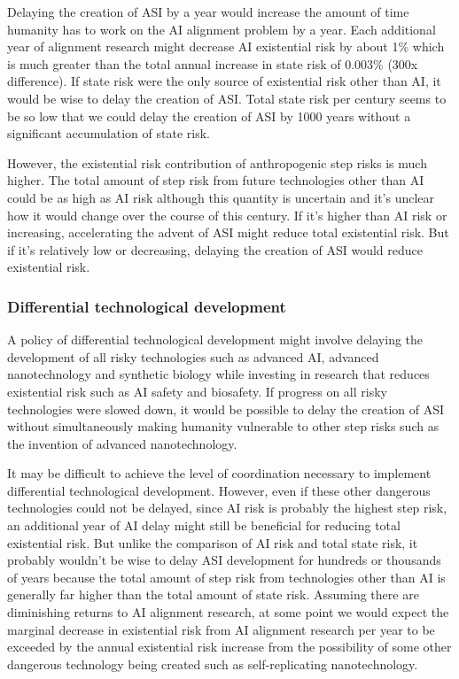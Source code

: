 \documentclass{article}
\begin{document}
Delaying the creation of ASI by a year would increase the amount of time humanity has to work on the AI alignment problem by a year. Each additional year of alignment research might decrease AI existential risk by about 1\% which is much greater than the total annual increase in state risk of 0.003\% (300x difference). If state risk were the only source of existential risk other than AI, it would be wise to delay the creation of ASI. Total state risk per century seems to be so low that we could delay the creation of ASI by 1000 years without a significant accumulation of state risk.

However, the existential risk contribution of anthropogenic step risks is much higher. The total amount of step risk from future technologies other than AI could be as high as AI risk \cite{theprecipice, globalcatastrophicriskssurvey} although this quantity is uncertain and it's unclear how it would change over the course of this century. If it’s higher than AI risk or increasing, accelerating the advent of ASI might reduce total existential risk. But if it's relatively low or decreasing, delaying the creation of ASI would reduce existential risk.

\subsubsection{Differential technological development}

A policy of differential technological development might involve delaying the development of all risky technologies such as advanced AI, advanced nanotechnology and synthetic biology while investing in research that reduces existential risk such as AI safety and biosafety. If progress on all risky technologies were slowed down, it would be possible to delay the creation of ASI without simultaneously making humanity vulnerable to other step risks such as the invention of advanced nanotechnology.

It may be difficult to achieve the level of coordination necessary to implement differential technological development. However, even if these other dangerous technologies could not be delayed, since AI risk is probably the highest step risk, an additional year of AI delay might still be beneficial for reducing total existential risk. But unlike the comparison of AI risk and total state risk, it probably wouldn’t be wise to delay ASI development for hundreds or thousands of years because the total amount of step risk from technologies other than AI is generally far higher than the total amount of state risk. Assuming there are diminishing returns to AI alignment research, at some point we would expect the marginal decrease in existential risk from AI alignment research per year to be exceeded by the annual existential risk increase from the possibility of some other dangerous technology being created such as self-replicating nanotechnology.
\end{document}
